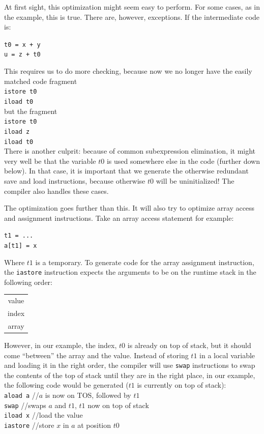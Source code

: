 \documentclass[a4paper]{article}
\begin{document}
\begin{description}
At first sight, this optimization might seem easy to perform. For some cases,
as in the example, this is true. There are, however, exceptions. If the
intermediate code is:
\begin{center}
\texttt{t0 = x + y}\\
\texttt{u = z + t0}\\
\end{center}

This requires us to do more checking, because now we no longer have the easily
matched code fragment\\
\texttt{istore t0}\\
\texttt{iload t0}\\
but the fragment\\
\texttt{istore t0}\\
\texttt{iload z}\\
\texttt{iload t0}\\

There is another culprit: because of common subexpression elimination, it
might very well be that the variable $t0$ is used somewhere else in the code
(further down below). In that case, it is important that we generate the
otherwise redundant save and load instructions, because otherwise $t0$ will be
uninitialized! The compiler also handles these cases.

The optimization goes further than this. It will also try to optimize array
access and assignment instructions. Take an array access statement for
example:
\begin{center}
\texttt{t1 = ...}\\
\texttt{a[t1] = x}
\end{center}

Where $t1$ is a temporary. To generate code for the array assignment
instruction, the \texttt{iastore} instruction expects the arguments to be
on the runtime stack in the following order:
\begin{center}
\begin{tabular}{|c|}
value \\
index \\
array \\
\hline
\end{tabular}
\end{center}

However, in our example, the index, $t0$ is already on top of stack, but it
should come ``between'' the array and the value.
Instead of storing $t1$ in a local variable and loading it in the
right order, the compiler will use \texttt{swap} instructions to swap the
contents of the top of stack until they are in the right place, in our
example, the following code would be generated ($t1$ is currently on top of
stack):\\
\texttt{aload a} //$a$ is now on TOS, followed by $t1$ \\
\texttt{swap} //swaps $a$ and $t1$, $t1$ now on top of stack \\
\texttt{iload x} //load the value \\
\texttt{iastore} //store $x$ in $a$ at position $t0$ \\


\end{description}
\end{document}
